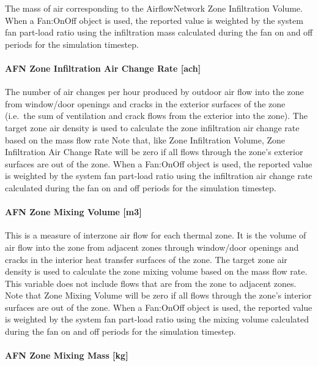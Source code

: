 The mass of air corresponding to the AirflowNetwork Zone Infiltration Volume. When a Fan:OnOff object is used, the reported value is weighted by the system fan part-load ratio using the infiltration mass calculated during the fan on and off periods for the simulation timestep.

\paragraph{AFN Zone Infiltration Air Change Rate {[}ach{]}}\label{afn-zone-infiltration-air-change-rate-ach}

The number of air changes per hour produced by outdoor air flow into the zone from window/door openings and cracks in the exterior surfaces of the zone (i.e.~the sum of ventilation and crack flows from the exterior into the zone). The target zone air density is used to calculate the zone infiltration air change rate based on the mass flow rate Note that, like Zone Infiltration Volume, Zone Infiltration Air Change Rate will be zero if all flows through the zone's exterior surfaces are out of the zone. When a Fan:OnOff object is used, the reported value is weighted by the system fan part-load ratio using the infiltration air change rate calculated during the fan on and off periods for the simulation timestep.

\paragraph{AFN Zone Mixing Volume {[}m3{]}}\label{afn-zone-mixing-volume-m3}

This is a measure of interzone air flow for each thermal zone. It is the volume of air flow into the zone from adjacent zones through window/door openings and cracks in the interior heat transfer surfaces of the zone. The target zone air density is used to calculate the zone mixing volume based on the mass flow rate. This variable does not include flows that are from the zone to adjacent zones. Note that Zone Mixing Volume will be zero if all flows through the zone's interior surfaces are out of the zone. When a Fan:OnOff object is used, the reported value is weighted by the system fan part-load ratio using the mixing volume calculated during the fan on and off periods for the simulation timestep.

\paragraph{AFN Zone Mixing Mass {[}kg{]}}\label{afn-zone-mixing-mass-kg}

